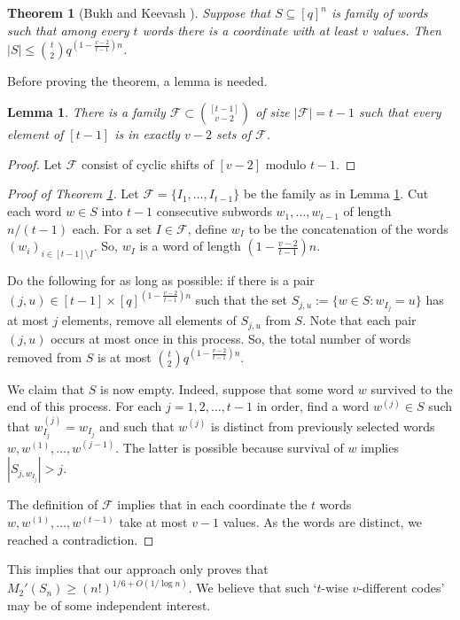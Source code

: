 \documentclass[12pt]{article}
\newtheorem{thm}{Theorem}
\newtheorem{lemma}{Lemma}
\begin{document}
\begin{thm}[Bukh and Keevash \cite{Bukh2025generalization}]\label{BK theorem}
Suppose that $S\subseteq [q]^n$ is family of words such that among every $t$ words there is a coordinate
with at least $v$ values. Then $|{S}|\leq \binom{t}{2}q^{(1-\frac{v-2}{t-1})n}$.
\end{thm}
Before proving the theorem, a lemma is needed.
\begin{lemma}\label{fam}
  There is a family $\mathcal{F}\subset \binom{[t-1]}{v-2}$ of size $|{\mathcal{F}}|=t-1$ such that every element of $[t-1]$
  is in exactly $v-2$ sets of $\mathcal{F}$.
\end{lemma}
\begin{proof}
Let $\mathcal{F}$ consist of cyclic shifts of $[v-2]$ modulo $t-1$.
\end{proof}
\begin{proof}[Proof of Theorem \ref{BK theorem}]
Let $\mathcal{F}=\{I_1,\dotsc,I_{t-1}\}$ be the family as in Lemma \ref{fam}. Cut each word $w\in S$ into $t-1$ consecutive subwords $w_1,...,w_{t-1}$ of length
$n/(t-1)$ each. For a set $I\in \mathcal{F}$, define $w_I$ to be the
concatenation of the words $(w_i)_{i \in [t-1]\setminus I}$. So, $w_I$ is a word of length
$(1-\frac{v-2}{t-1})n$.

Do the following for as long as possible: if there is a pair $(j,u)\in [t-1]\times [q]^{(1-\frac{v-2}{t-1})n}$ such that
the set $S_{j,u}:= \{w\in S: w_{I_j}=u\}$ has at most $j$ elements, remove all elements of $S_{j,u}$ from $S$. Note
that each pair $(j,u)$ occurs at most once in this process. So, the total number of words removed from $S$ is
at most $\binom{t}{2}q^{(1-\frac{v-2}{t-1})n}$.

We claim that $S$ is now empty. Indeed, suppose that some word $w$ survived to the end of this process.
For each $j=1,2,\dotsc,t-1$ in order, find a word $w^{(j)}\in S$ such that $w^{(j)}_{I_j}=w_{I_j}$ and such that
$w^{(j)}$ is distinct from previously selected words $w,w^{(1)},\dotsc,w^{(j-1)}$. The latter is possible because survival of $w$ implies
$|{S_{j,w_{I_j}}}|>j$.

The definition of $\mathcal{F}$ implies that in each coordinate the $t$ words $w,w^{(1)},\dotsc,w^{(t-1)}$ take at most $v-1$ values.
As the words are distinct, we reached a contradiction.
\end{proof}


This implies that our approach only proves that $M_2'(S_n)\ge(n!)^{1/6+O(1/\log n)}$. We believe that such `$t$-wise $v$-different codes' may be of some independent interest.
\end{document}
